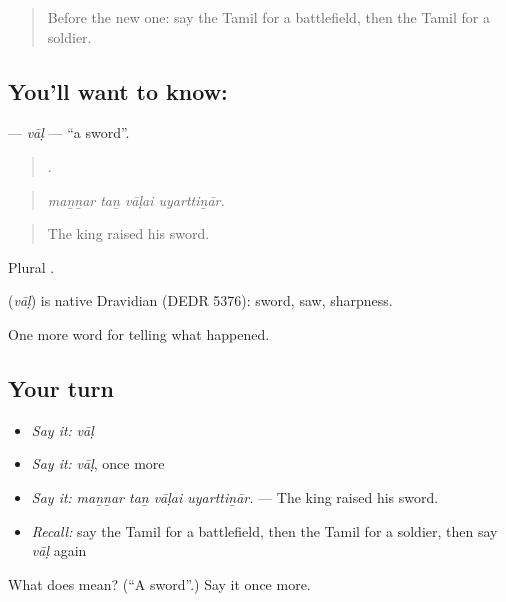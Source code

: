 \label{lesson:TA-C333-val-sword}



\begin{quote}
Before the new one: say the Tamil for a battlefield, then the Tamil for a soldier.
\end{quote}

\subsection*{You'll want to know: }
\textbf{} — \emph{vāḷ} — \textquotedblleft{}a sword\textquotedblright{}.

\begin{quote}
   .
\end{quote}

\begin{quote}
\emph{maṉṉar taṉ vāḷai uyarttiṉār.}
\end{quote}

\begin{quote}
The king raised his sword.
\end{quote}

Plural .

\begin{cousinweb}
\textbf{} (\emph{vāḷ}) is native Dravidian (DEDR 5376): sword, saw, sharpness.
\end{cousinweb}

\begin{grammarlens}[title={What you've built}]
One more word for telling what happened.
\end{grammarlens}

\subsection*{Your turn}
\begin{itemize}
\raggedright
  \item \emph{Say it:} \emph{vāḷ}
  \item \emph{Say it:} \emph{vāḷ}, once more
  \item \emph{Say it:} \emph{maṉṉar taṉ vāḷai uyarttiṉār.} — The king raised his sword.
  \item \emph{Recall:} say the Tamil for a battlefield, then the Tamil for a soldier, then say \emph{vāḷ} again
\end{itemize}

\begin{tcolorbox}[breakable,colback=teal!4,colframe=teal!35!black,title={Before you move on}]
What does  mean? (\textquotedblleft{}A sword\textquotedblright{}.) Say it once more.
\end{tcolorbox}
